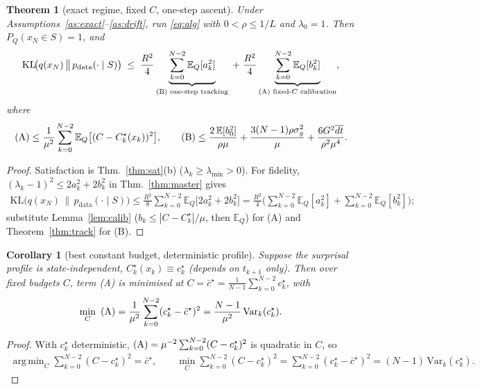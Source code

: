 \documentclass[11pt]{article}
\newcommand{\KL}{\mathrm{KL}}
\newcommand{\E}{\mathbb{E}}
\DeclareMathOperator*{\argmin}{arg\,min}
\newcommand{\lmin}{\lambda_{\min}}
\theoremstyle{plain}
\newtheorem{theorem}{Theorem}
\newtheorem{corollary}{Corollary}
\theoremstyle{definition}
\theoremstyle{remark}
\begin{document}
\begin{theorem}[exact regime, fixed $C$, one-step ascent]
\label{thm:main}
Under Assumptions~\ref{as:exact}--\ref{as:drift}, run \eqref{eq:alg} with $0<\rho\le1/L$
and $\lambda_0=1$. Then $P_Q(x_N\in S)=1$, and
\begin{equation}
\label{eq:main}
\KL\!\big(q(x_N)\,\big\|\,p_{\text{data}}(\cdot\mid S)\big)
\;\le\;\frac{R^2}{4}\underbrace{\sum_{k=0}^{N-2}\E_Q[a_k^2]}_{\textnormal{(B) one-step tracking}}
\;+\;\frac{R^2}{4}\underbrace{\sum_{k=0}^{N-2}\E_Q[b_k^2]}_{\textnormal{(A) fixed-}C\textnormal{ calibration}},
\end{equation}
where
\[
\textnormal{(A)}\le\frac{1}{\mu^2}\sum_{k=0}^{N-2}\E_Q\big[(C-C^\star_k(x_k))^2\big],
\qquad
\textnormal{(B)}\le\frac{2\,\E[b_0^2]}{\rho\mu}+\frac{3(N-1)\rho\sigma_g^2}{\mu}+\frac{6G^2\overline{dt}}{\rho^2\mu^4}.
\]
\end{theorem}
\begin{proof}
Satisfaction is Thm.~\ref{thm:sat}(b) ($\lambda_k\ge\lmin>0$). For fidelity, $(\lambda_k-1)^2\le2a_k^2+2b_k^2$ in Thm.~\ref{thm:master} gives
\begin{gather*}
\KL\!\big(q(x_N)\,\|\,p_{\text{data}}(\cdot\mid S)\big)\le\frac{R^2}{8}\sum_{k=0}^{N-2}\E_Q\big[2a_k^2+2b_k^2\big]
=\frac{R^2}{4}\Big(\sum_{k=0}^{N-2}\E_Q[a_k^2]+\sum_{k=0}^{N-2}\E_Q[b_k^2]\Big);
\end{gather*}
substitute Lemma~\ref{lem:calib} ($b_k\le|C-C^\star_k|/\mu$, then $\E_Q$) for \textnormal{(A)} and Theorem~\ref{thm:track} for \textnormal{(B)}.
\end{proof}

\begin{corollary}[best constant budget, deterministic profile]
\label{cor:bestC}
Suppose the surprisal profile is state-independent, $C^\star_k(x_k)\equiv c^\star_k$
(depends on $t_{k+1}$ only). Then over fixed budgets $C$, term \textnormal{(A)} is minimised
at $C=\bar c^\star=\frac{1}{N-1}\sum_{k=0}^{N-2}c^\star_k$, with
\[
\min_C\ \textnormal{(A)}=\frac{1}{\mu^2}\sum_{k=0}^{N-2}(c^\star_k-\bar c^\star)^2
=\frac{N-1}{\mu^2}\,\mathrm{Var}_k(c^\star_k).
\]
\end{corollary}
\begin{proof}
With $c^\star_k$ deterministic, $\textnormal{(A)}=\mu^{-2}\sum_{k=0}^{N-2}(C-c^\star_k)^2$ is quadratic in $C$, so
\begin{gather*}
\argmin_C\sum_{k=0}^{N-2}(C-c^\star_k)^2=\bar c^\star,\qquad
\min_C\sum_{k=0}^{N-2}(C-c^\star_k)^2=\sum_{k=0}^{N-2}(c^\star_k-\bar c^\star)^2=(N-1)\,\mathrm{Var}_k(c^\star_k).
\end{gather*}
\end{proof}
\end{document}
